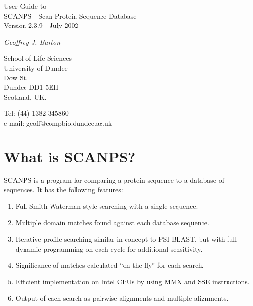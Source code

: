 \documentclass[12pt]{article}
\begin{document}
\begin{titlepage} 
\begin{center} 
\begin{Huge}
\begin{bf} 
\vskip 0.5in 

User Guide to \\

SCANPS - Scan Protein Sequence Database\\

Version 2.3.9 - July 2002\\

\end{bf}
\end{Huge}

\vskip 0.5in 

\begin{large}
{\em Geoffrey J. Barton}
\vskip 0.5in

School of Life Sciences\\
University of Dundee\\
Dow St.\\
Dundee DD1 5EH\\
Scotland, UK.\\


\vskip 0.25in

\end{large}
\vskip 0.25in
Tel:  (44) 1382-345860\\
e-mail:  geoff@compbio.dundee.ac.uk

\vskip 0.25in

\end{center}
\end{titlepage}

\section{What is SCANPS?}

SCANPS is a program for comparing a protein sequence to a database of
sequences.  It has the following features:

\begin{enumerate}

\item 
Full Smith-Waterman style searching with a single sequence.

\item 
Multiple domain matches found against each database sequence.

\item 
Iterative profile searching similar in concept to PSI-BLAST, but with
full dynamic programming on each cycle for additional sensitivity.

\item 
Significance of matches calculated ``on the fly'' for each search.

\item 
Efficient implementation on Intel CPUs by using MMX and SSE instructions.

\item 
Output of each search as pairwise alignments and multiple alignments.

\end{enumerate}
\end{document}
